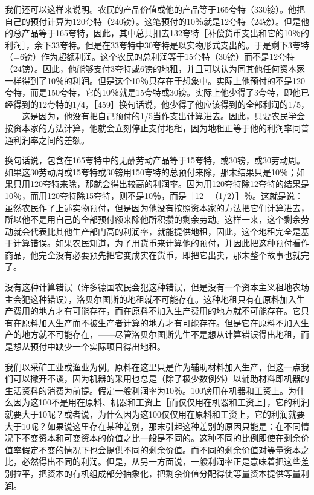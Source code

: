 我们还可以这样来说明。农民的产品价值或他的产品等于165夸特（330镑）。他把自己的预付计算为120夸特（240镑）。这笔预付的10％就是12夸特（24镑）。但是他的总产品等于165夸特，因此，其中总共扣去132夸特［补偿货币支出和它的10％的利润］，余下33夸特。但是在33夸特中30夸特是以实物形式支出的。于是剩下3夸特（=6镑）作为超额利润。这个农民的总利润等于15夸特（30镑）而不是12夸特（24镑）。因此，他能够支付3夸特或6镑的地租，并且可以认为同其他任何资本家一样得到了10％的利润。但是这个10％只存在于想象中。实际上他预付的不是120夸特，而是150夸特，它的10％就是15夸特或30镑。实际上他少得了3夸特，即他已经得到的12夸特的1/4，［459］换句话说，他少得了他应该得到的全部利润的1/5，——这是因为，他没有把自己预付的1/5当作支出计算进去。因此，只要农民学会按资本家的方法计算，他就会立刻停止支付地租，因为地租正等于他的利润率同普通利润率之间的差额。

换句话说，包含在165夸特中的无酬劳动产品等于15夸特，或30镑，或30劳动周。如果这30劳动周或15夸特或30镑用150夸特的总预付来除，那末结果只是10％；如果只用120夸特来除，那就会得出较高的利润率。因为用120夸特除12夸特的结果是10％，而用120夸特除15夸特，则不是10％，而是［12+（1/2）］％。这就是说：虽然农民作了上述实物预付，但是因为他没有按照资本家的方法把它们计算进去，所以他不是用自己的全部预付额来除他所积攒的剩余劳动。这样一来，这个剩余劳动就会代表比其他生产部门高的利润率，就能提供地租，因此，这个地租完全是基于计算错误。如果农民知道，为了用货币来计算他的预付，并因此把这种预付看作商品，他完全没有必要预先把它变成实在货币，即把它出卖，那末整个故事也就完了。

没有这种计算错误（许多德国农民会犯这种错误，但是没有一个资本主义租地农场主会犯这种错误），洛贝尔图斯的地租就不可能存在。这种地租只有在原料加入生产费用的地方才有可能存在，而在原料不加入生产费用的地方就不可能存在。它只有在原料加入生产而不被生产者计算的地方才有可能存在。但是它在原料不加入生产的地方就不可能存在，——尽管洛贝尔图斯先生不是想从计算错误得出地租，而是想从预付中缺少一个实际项目得出地租。

我们以采矿工业或渔业为例。原料在这里只是作为辅助材料加入生产，但这一点我们可以撇开不谈，因为机器的采用也总是（除了极少数例外）以辅助材料即机器的生活资料的消费为前提。假定一般利润率为10％。100镑用在机器和工资上。为什么因为这100不是用在原料、机器和工资上［而仅仅用在机器和工资上］，它的利润就要大于10呢？或者说，为什么因为这100仅仅用在原料和工资上，它的利润就要大于10呢？如果说这里存在某种差别，那末引起这种差别的原因只能是：在不同情况下不变资本和可变资本的价值之比一般是不同的。这种不同的比例即使在剩余价值率假定不变的情况下也会提供不同的剩余价值。而不同的剩余价值对等量资本之比，必然得出不同的利润。但是，从另一方面说，一般利润率正是意味着把这些差别拉平，把资本的有机组成部分抽象化，把剩余价值分配得使等量资本提供等量利润。

